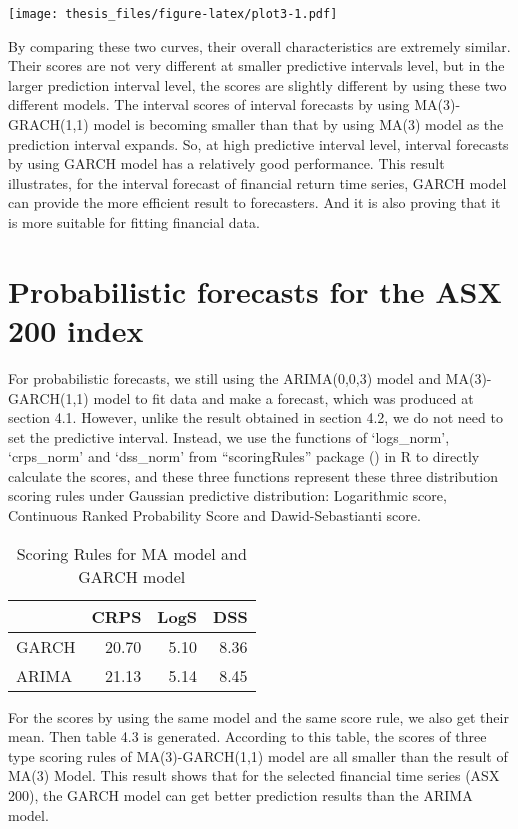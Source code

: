 \documentclass{monashthesis}
\theoremstyle{definition}
\theoremstyle{definition}
\theoremstyle{definition}
\theoremstyle{remark}
\begin{document}
\texttt{[image: thesis\_files/figure-latex/plot3-1.pdf]}

By comparing these two curves, their overall characteristics are
extremely similar. Their scores are not very different at smaller
predictive intervals level, but in the larger prediction interval level,
the scores are slightly different by using these two different models.
The interval scores of interval forecasts by using MA(3)-GRACH(1,1)
model is becoming smaller than that by using MA(3) model as the
prediction interval expands. So, at high predictive interval level,
interval forecasts by using GARCH model has a relatively good
performance. This result illustrates, for the interval forecast of
financial return time series, GARCH model can provide the more efficient
result to forecasters. And it is also proving that it is more suitable
for fitting financial data.

\section{Probabilistic forecasts for the ASX 200
index}\label{probabilistic-forecasts-for-the-asx-200-index}

For probabilistic forecasts, we still using the ARIMA(0,0,3) model and
MA(3)-GARCH(1,1) model to fit data and make a forecast, which was
produced at section 4.1. However, unlike the result obtained in section
4.2, we do not need to set the predictive interval. Instead, we use the
functions of `logs\_norm', `crps\_norm' and `dss\_norm' from
``scoringRules'' package (\textcite{JKL17}) in R to directly calculate
the scores, and these three functions represent these three distribution
scoring rules under Gaussian predictive distribution: Logarithmic score,
Continuous Ranked Probability Score and Dawid-Sebastianti score.

\begin{table}

\caption{\label{tab:table2}Scoring Rules for MA model and GARCH model}
\centering
\begin{tabular}[t]{lrrr}
\toprule
  & CRPS & LogS & DSS\\
\midrule
GARCH & 20.70 & 5.10 & 8.36\\
ARIMA & 21.13 & 5.14 & 8.45\\
\bottomrule
\end{tabular}
\end{table}

For the scores by using the same model and the same score rule, we also
get their mean. Then table 4.3 is generated. According to this table,
the scores of three type scoring rules of MA(3)-GARCH(1,1) model are all
smaller than the result of MA(3) Model. This result shows that for the
selected financial time series (ASX 200), the GARCH model can get better
prediction results than the ARIMA model.
\end{document}

